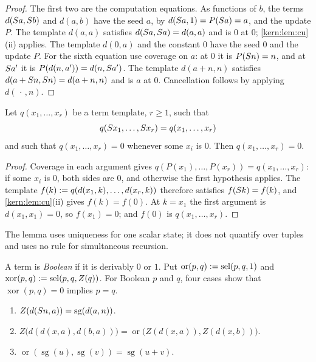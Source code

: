 \begin{proof}
The first two are the computation equations.  As functions of $b$, the
terms $d(S a,S b)$ and $d(a,b)$ have the seed $a$, by
$d(S a,1)=P(S a)=a$, and the update $P$.  The template $d(a,a)$
satisfies $d(S a,S a)=d(a,a)$ and is $0$ at $0$;
\cref{kern:lem:cu}(ii) applies.  The template $d(0,a)$ and the constant $0$
have the seed $0$ and the update $P$.  For the sixth equation use coverage
on $a$: at $0$ it is $P(S n)=n$, and at $S a'$ it is
$P(d(n,a'))=d(n,S a')$.  The template $d(a+n,n)$ satisfies
$d(a+S n,S n)=d(a+n,n)$ and is $a$ at $0$.  Cancellation follows by
applying $d(\,\cdot\,,n)$.
\end{proof}

\begin{lemma}
\label{kern:lem:dd}
Let $q(x_1,\dots,x_r)$ be a term template, $r\ge 1$, such that
\[
 q(S x_1,\dots,S x_r)=q(x_1,\dots,x_r)
\]
and such that $q(x_1,\dots,x_r)=0$ whenever some $x_i$ is $0$.  Then
$q(x_1,\dots,x_r)=0$.
\end{lemma}

\begin{proof}
Coverage in each argument gives
$q(P(x_1),\dots,P(x_r))=q(x_1,\dots,x_r)$: if some $x_i$ is $0$, both sides
are $0$, and otherwise the first hypothesis applies.  The template
$f(k)\mathrel{:=} q(d(x_1,k),\dots,d(x_r,k))$ therefore satisfies
$f(S k)=f(k)$, and \cref{kern:lem:cu}(ii) gives $f(k)=f(0)$.  At
$k=x_1$ the first argument is $d(x_1,x_1)=0$, so $f(x_1)=0$; and $f(0)$ is
$q(x_1,\dots,x_r)$.
\end{proof}

The lemma uses uniqueness for one scalar state; it does not quantify over
tuples and uses no rule for simultaneous recursion.

A term is \emph{Boolean} if it is derivably $0$ or $1$.  Put
$\operatorname{or}(p,q)\mathrel{:=}\operatorname{sel}(p,q,1)$ and
$\operatorname{xor}(p,q)\mathrel{:=}\operatorname{sel}(p,q,Z(q))$.  For Boolean $p$ and $q$,
four cases show that $\operatorname{xor}(p,q)=0$ implies $p=q$.

\begin{lemma}
\label{kern:lem:bool}
\begin{enumerate}[label=\textup{(\roman*)}]
\item $Z(d(S n,a))=\operatorname{sg}(d(a,n))$.
\item $Z\bigl(d(d(x,a),d(b,a))\bigr)
 =\operatorname{or}\bigl(Z(d(x,a)),Z(d(x,b))\bigr)$.
\item $\operatorname{or}(\operatorname{sg}(u),\operatorname{sg}(v))
 =\operatorname{sg}(u+v)$.
\end{enumerate}
\end{lemma}

